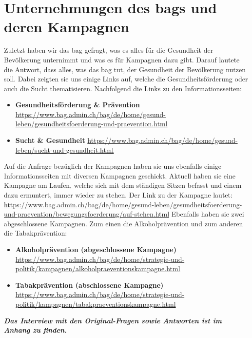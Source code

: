 \section{Unternehmungen des \acsp{bag} und deren Kampagnen}
Zuletzt haben wir das \acs{bag} gefragt, was es alles für die Gesundheit der Bevölkerung unternimmt und was es für Kampagnen dazu gibt. Darauf lautete die Antwort, dass alles, was das \acs{bag} tut, der Gesundheit der Bevölkerung nutzen soll. Dabei zeigten sie uns einige Links auf, welche die Gesundheitsförderung oder auch die Sucht thematisieren. Nachfolgend die Links zu den Informationsseiten: 
\begin{itemize}
  \item \textbf{Gesundheitsförderung \& Prävention}
  \newline
  \url{https://www.bag.admin.ch/bag/de/home/gesund-leben/gesundheitsfoerderung-und-praevention.html}
  \item \textbf{Sucht \& Gesundheit}
  \newline
  \url{https://www.bag.admin.ch/bag/de/home/gesund-leben/sucht-und-gesundheit.html}
\end{itemize}
Auf die Anfrage bezüglich der Kampagnen haben sie uns ebenfalls einige Informationsseiten mit diversen Kampagnen geschickt. Aktuell haben sie eine Kampagne am Laufen, welche sich mit dem ständigen Sitzen befasst und einem dazu ermuntert, immer wieder zu stehen. Der Link zu der Kampagne lautet:
\newline
\url{https://www.bag.admin.ch/bag/de/home/gesund-leben/gesundheitsfoerderung-und-praevention/bewegungsfoerderung/auf-stehen.html}
\newline
Ebenfalls haben sie zwei abgeschlossene Kampagnen. Zum einen die Alkoholprävention und zum anderen die Tabakprävention:
\begin{itemize}
  \item \textbf{Alkoholprävention (abgeschlossene Kampagne)}
  \newline
  \url{https://www.bag.admin.ch/bag/de/home/strategie-und-politik/kampagnen/alkoholpraeventionskampagne.html}
  \item \textbf{Tabakprävention (abschlossene Kampagne)}
  \newline
  \url{https://www.bag.admin.ch/bag/de/home/strategie-und-politik/kampagnen/tabakpraeventionskampagne.html}
\end{itemize}
\vspace{50pt}
\textbf{\textit{Das Interview mit den Original-Fragen sowie Antworten ist im Anhang zu finden.}}